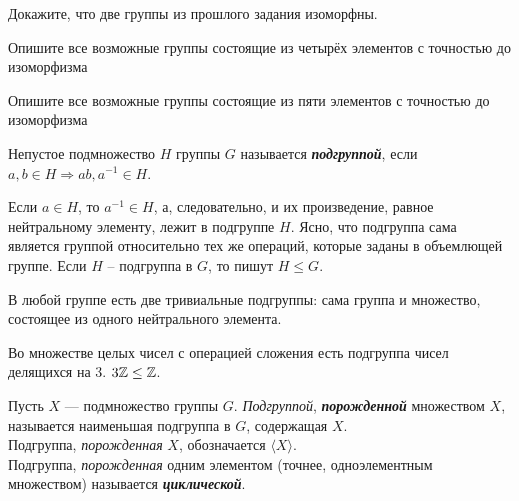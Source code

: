 \documentclass{article}
\begin{document}
    \begin{task_boxed}
        Докажите, что две группы из прошлого задания изоморфны.
    \end{task_boxed}

    \begin{task_boxed}
        Опишите все возможные группы состоящие из четырёх элементов с точностью до изоморфизма
    \end{task_boxed}

    \begin{task_boxed}[ *]
        Опишите все возможные группы состоящие из пяти элементов с точностью до изоморфизма
    \end{task_boxed}

    \begin{definition_boxed}
        Непустое подмножество $H$ группы $G$ называется \textbf{\textit{подгруппой}}, если $a, b \in H \Rightarrow ab, a^{-1} \in H$.
    \end{definition_boxed}

    \begin{example}
        Если $a \in H$, то $a^{-1} \in H$, а, следовательно, и их произведение, равное нейтральному элементу, лежит в подгруппе $H$.
        Ясно, что подгруппа сама является группой относительно тех же операций, которые заданы в объемлющей группе.
        Если $H$ – подгруппа в $G$, то пишут $H \leq G$.
    \end{example}

    \begin{example}
        В любой группе есть две тривиальные подгруппы: сама группа и множество, состоящее из одного нейтрального элемента.
    \end{example}

    \begin{example}
        Во множестве целых чисел с операцией сложения есть подгруппа чисел делящихся на 3. $3\mathbb{Z} \leq \mathbb{Z}$.
    \end{example}


    \begin{definition_boxed}
        Пусть $X$ — подмножество группы $G$. \textit{Подгруппой}, \textbf{\textit{порожденной}} множеством $X$, называется наименьшая подгруппа в $G$, содержащая $X$.\\
        Подгруппа, \textit{порожденная} $X$, обозначается $\langle X \rangle$.\\
        Подгруппа, \textit{порожденная} одним элементом (точнее, одноэлементным множеством) называется \textbf{\textit{циклической}}.
    \end{definition_boxed}
\end{document}
